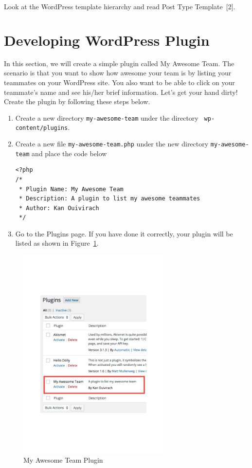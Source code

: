 \documentclass{article}
\begin{document}
 Look at the WordPress template hierarchy and read Post
Type Template~[2].

\section*{Developing WordPress Plugin}

\noindent In this section, we will create a simple plugin called My Awesome
Team. The scenario is that you want to show how awesome your team is by listing
your teammates on your WordPress site. You also want to be able to click on
your teammate's name and see his/her brief information. Let's get your hand
dirty! \\

\noindent Create the plugin by following these steps below.

\begin{enumerate}
    \item Create a new directory {\tt my-awesome-team} under the directory {\tt
        wp-content/plugins}.
    \item Create a new file {\tt my-awesome-team.php} under the new directory
        {\tt my-awesome-team} and place the code below
\begin{verbatim}
<?php
/*
 * Plugin Name: My Awesome Team
 * Description: A plugin to list my awesome teammates
 * Author: Kan Ouivirach
 */
\end{verbatim}
    \item Go to the Plugins page. If you have done it correctly, your plugin
        will be listed as shown in Figure~\ref{fig:my-awesome-team-plugin}.
\end{enumerate}

\begin{figure}[t]
    \centering
    \includegraphics[width=3in]{figures/my-awesome-team-plugin}
    \caption{My Awesome Team Plugin}
    \label{fig:my-awesome-team-plugin}
\end{figure}
\end{document}
